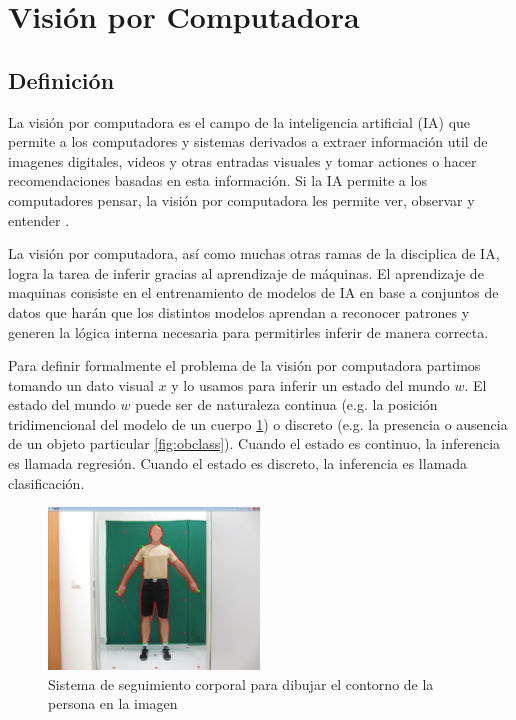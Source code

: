 \documentclass[letter,12pt]{report}
\begin{document}
\section{Visión por Computadora}
\subsection{Definición}
La visión por computadora es el campo de la inteligencia artificial (IA) que permite a
los computadores y sistemas derivados a extraer información util de imagenes digitales,
videos y otras entradas visuales y tomar actiones o hacer recomendaciones basadas en esta
información. Si la IA permite a los computadores pensar, la visión por computadora les
permite ver, observar y entender \cite{IBM}.

La visión por computadora, así como muchas otras ramas de la disciplica de IA, logra la
tarea de inferir gracias al aprendizaje de máquinas. El aprendizaje de maquinas consiste
en el entrenamiento de modelos de IA en base a conjuntos de datos que harán que los
distintos modelos aprendan a reconocer patrones y generen la lógica interna necesaria
para permitirles inferir de manera correcta.

Para definir formalmente el problema de la visión por computadora \cite{Prince} partimos
tomando un dato visual $x$ y lo usamos para inferir un estado del mundo $w$. El estado
del mundo $w$ puede ser de naturaleza continua (e.g. la posición tridimencional del
modelo de un cuerpo \ref{fig:body}) o discreto (e.g. la presencia o ausencia de un objeto
particular \ref{fig:obclass}).  Cuando el estado es continuo, la inferencia es llamada
regresión. Cuando el estado es discreto, la inferencia es llamada clasificación.

\begin{figure}[H]
    \centering
    \includegraphics[width=0.5\textwidth]{body}
    \caption{Sistema de seguimiento corporal para dibujar el contorno de la persona en la
    imagen}
    \label{fig:body}
\end{figure}
\end{document}
